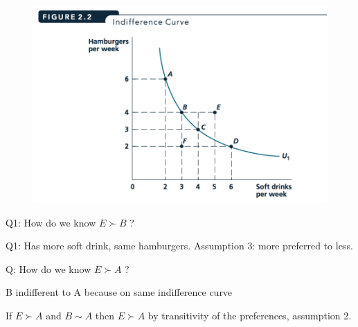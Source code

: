 \documentclass[table]{beamer}
\begin{document}
\begin{frame}

\begin{figure}

{\centering \includegraphics[width=13.22in,height=0.85\textheight]{picsfigs/indifccurve} 

}

\end{figure}

Q1: How do we know \(E \succ B\) ?

Q1: Has more soft drink, same hamburgers. Assumption 3: more preferred
to less.

Q: How do we know \(E \succ A\) ?

B indifferent to A because on same indifference curve

If \(E \succ A\) and \(B \sim A\) then \(E \succ A\) by transitivity of
the preferences, assumption 2.

\end{frame}
\end{document}
